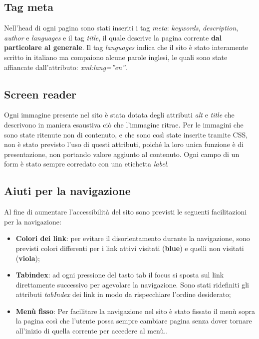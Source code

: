 	\subsection{Tag meta}
	Nell'head di ogni pagina sono stati inseriti  i tag \textit{meta}:  \textit{keywords}, \textit{description}, \textit{author} e \textit{languages} e il tag \textit{title}, il quale descrive la pagina corrente \textbf{dal particolare al generale}. Il tag \textit{languages} indica che il sito è stato interamente scritto in italiano ma compaiono alcune parole inglesi, le quali sono state affiancate dall’attributo: \textit{xml:lang=”en”}.
	
	\subsection{Screen reader}
	Ogni immagine presente nel sito è stata dotata degli attributi \textit{alt} e \textit{title} che descrivono in maniera esaustiva ciò che l'immagine ritrae. Per le immagini che sono state ritenute non di contenuto, e che sono così state inserite tramite CSS, non è stato previsto l'uso di questi attributi, poiché la loro unica funzione è di presentazione, non portando valore aggiunto al contenuto.
	Ogni campo di un form è stato sempre corredato con una etichetta \textit{label}.
	
	\subsection{Aiuti per la navigazione}
	Al fine di aumentare l'accessibilità del sito sono previsti le seguenti facilitazioni per la navigazione:
	\begin{itemize}
		\item \textbf{Colori dei link}: per evitare il disorientamento durante la navigazione, sono previsti colori differenti per i link attivi visitati (\textbf{blue}) e quelli non visitati (\textbf{viola});
		\item \textbf{Tabindex}: ad ogni pressione del tasto tab il focus si sposta sul link direttamente successivo per agevolare la navigazione. Sono stati ridefiniti gli attributi \textit{tabIndex} dei link in modo da rispecchiare l'ordine desiderato;
		\item \textbf{Menù fisso}: Per facilitare la navigazione nel sito è stato fissato il menù sopra la pagina così che l'utente possa sempre cambiare pagina senza dover tornare all'inizio di quella corrente per accedere al menù..
	\end{itemize}
	


